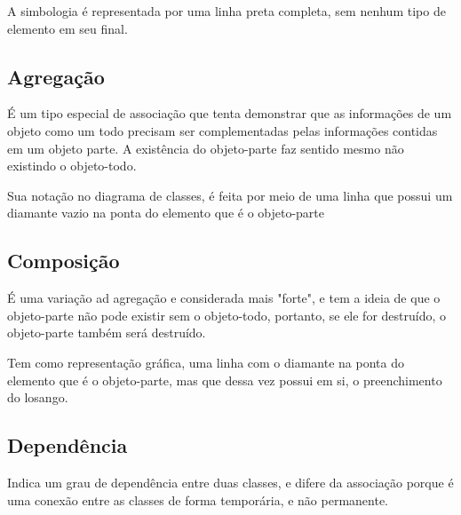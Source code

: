 \documentclass[12pt a4paper]{paper}
\begin{document}
A simbologia é representada por uma linha preta completa, sem nenhum tipo de elemento 
em seu final.

\subsection{Agregação} %
\label{sub:Agregação}
É um tipo especial de associação que tenta demonstrar que as informações de um objeto 
como um todo precisam ser complementadas pelas informações contidas em um objeto parte. 
A existência do objeto-parte faz sentido mesmo não existindo o objeto-todo.

Sua notação no diagrama de classes, é feita por meio de uma linha que possui um 
diamante vazio na ponta do elemento que é o objeto-parte

\subsection{Composição} %
\label{sub:Composição}
É uma variação ad agregação e considerada mais "forte", e tem a ideia de que o 
objeto-parte não pode existir sem o objeto-todo, portanto, se ele for destruído, o 
objeto-parte também será destruído. 

Tem como representação gráfica, uma linha com o diamante na ponta do elemento que é 
o objeto-parte, mas que dessa vez possui em si, o preenchimento do losango.

\subsection{Dependência} %
\label{sub:Dependência}
 Indica um grau de dependência entre duas classes, e difere da associação porque 
 é uma conexão entre as classes de forma temporária, e não permanente.
 
\end{document}
